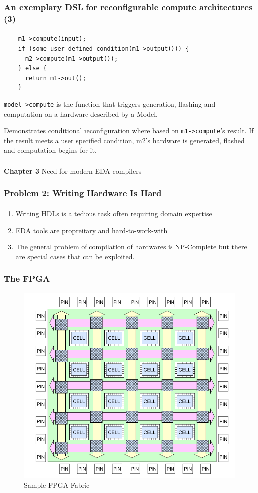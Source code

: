 \documentclass{beamer}
\begin{document}
\begin{frame}[fragile]
  \frametitle{An exemplary DSL for reconfigurable compute architectures (3)}
\framesubtitle{}
  \begin{verbatim}
    m1->compute(input);
    if (some_user_defined_condition(m1->output())) {
      m2->compute(m1->output());
    } else {
      return m1->out();
    }
\end{verbatim}
  \texttt{model->compute} is the function that triggers generation, flashing and
  computation on a hardware described by a Model.

  Demonstrates conditional reconfiguration where based on \texttt{m1->compute}'s
  result. If the result meets a user specified condition, m2's hardware is
  generated, flashed and computation begins for it.
\end{frame}

\begin{frame}[c,fragile]
  \frametitle{}

  \centering
  \textbf{Chapter 3} 
  \centering
  Need for modern EDA compilers
\end{frame}

\newcommand\myheading[1]{%
  \par\bigskip
  {\Large\bfseries#1}\par\smallskip}

 
\begin{frame}[fragile]
  \frametitle{Problem 2: Writing Hardware Is Hard}
  \framesubtitle{}
  \begin{enumerate}
    \item Writing HDLs is a tedious task often requiring domain expertise
    \item EDA tools are propreitary and hard-to-work-with
    \item The general problem of compilation of hardwares is NP-Complete but
      there are special cases that can be exploited.
  \end{enumerate}
\end{frame}


\begin{frame}[fragile]
  \frametitle{The FPGA}
  \begin{figure}
    \centering
    \includegraphics[width=0.5\linewidth]{images/fpga_fabric.png}
    \caption{Sample FPGA Fabric\cite{brown92}}
    \label{exa-fabric}
  \end{figure}
\end{frame}
\end{document}

